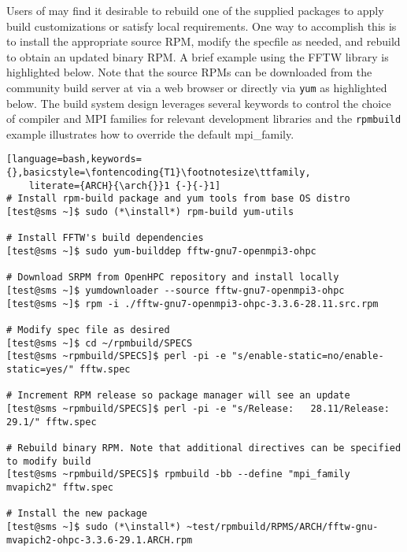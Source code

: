 Users of \OHPC{} may find it desirable to rebuild one of the supplied packages
to apply build customizations or satisfy local requirements. One way to
accomplish this is to install the appropriate source RPM, modify the specfile
as needed, and rebuild to obtain an updated binary RPM. A brief example using
the FFTW library is highlighted below.  Note that the source RPMs can be downloaded from the
community build server at \href{https://build.openhpc.community}
{\color{blue}{https://build.openhpc.community}} via a web browser or directly
via \texttt{yum} as highlighted below. The \OHPC{} build system design
leverages several keywords to control the choice of compiler and MPI families
for relevant development libraries and the \texttt{rpmbuild} example
illustrates how to override the default mpi\_family.

\begin{lstlisting}[language=bash,keywords={},basicstyle=\fontencoding{T1}\footnotesize\ttfamily,
    literate={ARCH}{\arch{}}1 {-}{-}1]
# Install rpm-build package and yum tools from base OS distro
[test@sms ~]$ sudo (*\install*) rpm-build yum-utils

# Install FFTW's build dependencies
[test@sms ~]$ sudo yum-builddep fftw-gnu7-openmpi3-ohpc

# Download SRPM from OpenHPC repository and install locally
[test@sms ~]$ yumdownloader --source fftw-gnu7-openmpi3-ohpc
[test@sms ~]$ rpm -i ./fftw-gnu7-openmpi3-ohpc-3.3.6-28.11.src.rpm

# Modify spec file as desired
[test@sms ~]$ cd ~/rpmbuild/SPECS
[test@sms ~rpmbuild/SPECS]$ perl -pi -e "s/enable-static=no/enable-static=yes/" fftw.spec

# Increment RPM release so package manager will see an update
[test@sms ~rpmbuild/SPECS]$ perl -pi -e "s/Release:   28.11/Release:   29.1/" fftw.spec

# Rebuild binary RPM. Note that additional directives can be specified to modify build
[test@sms ~rpmbuild/SPECS]$ rpmbuild -bb --define "mpi_family mvapich2" fftw.spec

# Install the new package
[test@sms ~]$ sudo (*\install*) ~test/rpmbuild/RPMS/ARCH/fftw-gnu-mvapich2-ohpc-3.3.6-29.1.ARCH.rpm
\end{lstlisting}
